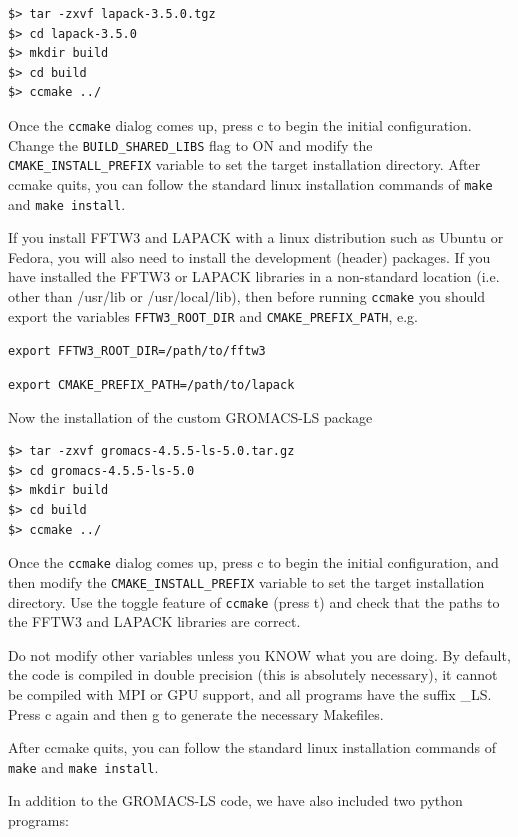 \documentclass[10pt,letterpaper,notitlepage]{article}
\begin{document}
\begin{lstlisting}[caption=Installing LAPACK with CMake]
$> tar -zxvf lapack-3.5.0.tgz
$> cd lapack-3.5.0
$> mkdir build
$> cd build
$> ccmake ../
\end{lstlisting}

Once the \texttt{ccmake} dialog comes up, press c to begin the initial configuration. Change the \texttt{BUILD\_SHARED\_LIBS} flag to ON and modify the \texttt{CMAKE\_INSTALL\_PREFIX} variable to set the target installation directory. After ccmake quits, you can follow the standard linux installation commands of \texttt{make} and \texttt{make install}.

If you install FFTW3 and LAPACK with a linux distribution such as Ubuntu or Fedora, you will also need to install the development (header) packages. If you have installed the FFTW3 or LAPACK libraries in a non-standard location (i.e. other than /usr/lib or /usr/local/lib), then before running \texttt{ccmake} you should export the variables \texttt{FFTW3\_ROOT\_DIR} and \texttt{CMAKE\_PREFIX\_PATH}, e.g.

\texttt{export FFTW3\_ROOT\_DIR=/path/to/fftw3}

\texttt{export CMAKE\_PREFIX\_PATH=/path/to/lapack}

Now the installation of the custom GROMACS-LS package

\begin{lstlisting}[caption=Installing LAPACK with CMake]
$> tar -zxvf gromacs-4.5.5-ls-5.0.tar.gz
$> cd gromacs-4.5.5-ls-5.0
$> mkdir build
$> cd build
$> ccmake ../
\end{lstlisting}

Once the \texttt{ccmake} dialog comes up, press c to begin the initial configuration, and then modify the \texttt{CMAKE\_INSTALL\_PREFIX} variable to set the target installation directory. Use the toggle feature of \texttt{ccmake} (press t) and check that the paths to the FFTW3 and LAPACK libraries are correct.

Do not modify other variables unless you KNOW what you are doing. By default, the code is compiled in double precision (this is absolutely necessary), it cannot be compiled with MPI or GPU support, and all programs have the suffix \_LS. Press c again and then g to generate the necessary Makefiles.

After ccmake quits, you can follow the standard linux installation commands of \texttt{make} and \texttt{make install}.

In addition to the GROMACS-LS code, we have also included two python programs:
\end{document}
